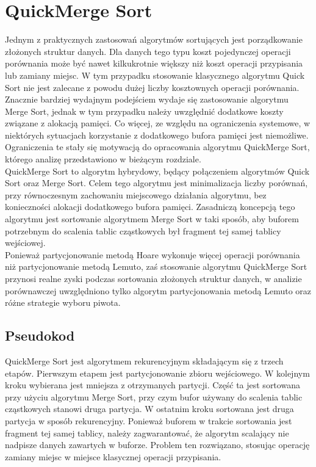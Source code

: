 \section{QuickMerge Sort}
Jednym z praktycznych zastosowań algorytmów sortujących jest porządkowanie złożonych struktur danych. Dla danych tego typu koszt pojedynczej operacji porównania może być nawet kilkukrotnie większy niż koszt operacji przypisania lub zamiany miejsc. W tym przypadku stosowanie klasycznego algorytmu Quick Sort nie jest zalecane z powodu dużej liczby kosztownych operacji porównania. Znacznie bardziej wydajnym podejściem wydaje się zastosowanie algorytmu Merge Sort, jednak w tym przypadku należy uwzględnić dodatkowe koszty związane z alokacją pamięci. Co więcej, ze względu na ograniczenia systemowe, w niektórych sytuacjach korzystanie z dodatkowego bufora pamięci jest niemożliwe. Ograniczenia te stały się motywacją do opracowania algorytmu QuickMerge Sort, którego analizę przedstawiono w bieżącym rozdziale.\\

QuickMerge Sort to algorytm hybrydowy, będący połączeniem algorytmów Quick Sort oraz Merge Sort. Celem tego algorytmu jest minimalizacja liczby porównań, przy równoczesnym zachowaniu miejscowego działania algorytmu, bez konieczności alokacji dodatkowego bufora pamięci. Zasadniczą koncepcją tego algorytmu jest sortowanie algorytmem Merge Sort w taki sposób, aby buforem potrzebnym do scalenia tablic cząstkowych był fragment tej samej tablicy wejściowej.\\


Ponieważ partycjonowanie metodą Hoare wykonuje więcej operacji porównania niż partycjonowanie metodą Lemuto, zaś stosowanie algorytmu QuickMerge Sort przynosi realne zyski podczas sortowania złożonych struktur danych, w analizie porównawczej uwzględniono tylko algorytm partycjonowania metodą Lemuto oraz różne strategie wyboru piwota.\\

\subsection{Pseudokod}

QuickMerge Sort jest algorytmem rekurencyjnym składającym się z trzech etapów. Pierwszym etapem jest partycjonowanie zbioru wejściowego. W kolejnym kroku wybierana jest mniejsza z otrzymanych partycji. Część ta jest sortowana przy użyciu algorytmu Merge Sort, przy czym bufor używany do scalenia tablic cząstkowych stanowi druga partycja. W ostatnim kroku sortowana jest druga partycja w sposób rekurencyjny. Ponieważ buforem w trakcie sortowania jest fragment tej samej tablicy, należy zagwarantować, że algorytm scalający nie nadpisze danych zawartych w buforze. Problem ten rozwiązano, stosując operację zamiany miejsc w miejsce klasycznej operacji przypisania.\\

